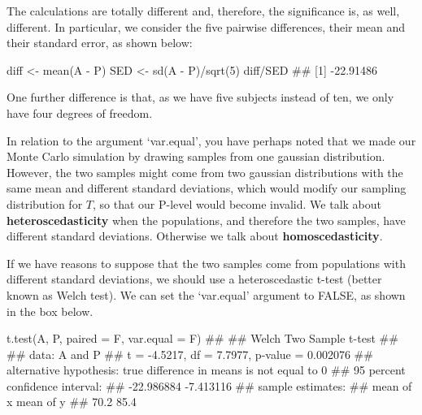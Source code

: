 \documentclass[a4paper,12pt,oneside]{book}
\newenvironment{Shaded}{\begin{snugshade}}{\end{snugshade}}
\newcommand{\DecValTok}[1]{#1}
\newcommand{\SpecialCharTok}[1]{#1}
\newcommand{\DocumentationTok}[1]{#1}
\newcommand{\OtherTok}[1]{#1}
\newcommand{\FunctionTok}[1]{#1}
\newcommand{\AttributeTok}[1]{#1}
\newcommand{\NormalTok}[1]{#1}
\begin{document}
The calculations are totally different and, therefore, the significance is, as well, different. In particular, we consider the five pairwise differences, their mean and their standard error, as shown below:

\begin{Shaded}
\begin{Highlighting}[]
\NormalTok{diff }\OtherTok{\textless{}{-}} \FunctionTok{mean}\NormalTok{(A }\SpecialCharTok{{-}}\NormalTok{ P)}
\NormalTok{SED }\OtherTok{\textless{}{-}} \FunctionTok{sd}\NormalTok{(A }\SpecialCharTok{{-}}\NormalTok{ P)}\SpecialCharTok{/}\FunctionTok{sqrt}\NormalTok{(}\DecValTok{5}\NormalTok{) }
\NormalTok{diff}\SpecialCharTok{/}\NormalTok{SED}
\DocumentationTok{\#\# [1] {-}22.91486}
\end{Highlighting}
\end{Shaded}

One further difference is that, as we have five subjects instead of ten, we only have four degrees of freedom.

In relation to the argument `var.equal', you have perhaps noted that we made our Monte Carlo simulation by drawing samples from one gaussian distribution. However, the two samples might come from two gaussian distributions with the same mean and different standard deviations, which would modify our sampling distribution for \(T\), so that our P-level would become invalid. We talk about \textbf{heteroscedasticity} when the populations, and therefore the two samples, have different standard deviations. Otherwise we talk about \textbf{homoscedasticity}.

If we have reasons to suppose that the two samples come from populations with different standard deviations, we should use a heteroscedastic t-test (better known as Welch test). We can set the `var.equal' argument to FALSE, as shown in the box below.

\begin{Shaded}
\begin{Highlighting}[]
\FunctionTok{t.test}\NormalTok{(A, P, }\AttributeTok{paired =}\NormalTok{ F, }\AttributeTok{var.equal =}\NormalTok{ F)}
\DocumentationTok{\#\# }
\DocumentationTok{\#\#  Welch Two Sample t{-}test}
\DocumentationTok{\#\# }
\DocumentationTok{\#\# data:  A and P}
\DocumentationTok{\#\# t = {-}4.5217, df = 7.7977, p{-}value = 0.002076}
\DocumentationTok{\#\# alternative hypothesis: true difference in means is not equal to 0}
\DocumentationTok{\#\# 95 percent confidence interval:}
\DocumentationTok{\#\#  {-}22.986884  {-}7.413116}
\DocumentationTok{\#\# sample estimates:}
\DocumentationTok{\#\# mean of x mean of y }
\DocumentationTok{\#\#      70.2      85.4}
\end{Highlighting}
\end{Shaded}
\end{document}
